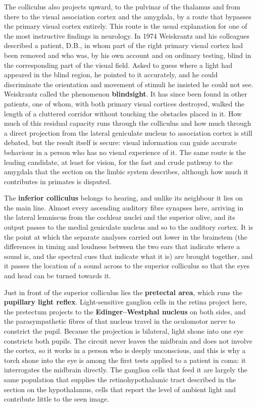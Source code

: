 \documentclass[11pt]{article}
\begin{document}
The colliculus also projects upward, to the pulvinar of the thalamus and from there to the visual association cortex and the amygdala, by a route that bypasses the primary visual cortex entirely. This route is the usual explanation for one of the most instructive findings in neurology. In 1974 Weiskrantz and his colleagues described a patient, D.B., in whom part of the right primary visual cortex had been removed and who was, by his own account and on ordinary testing, blind in the corresponding part of the visual field. Asked to guess where a light had appeared in the blind region, he pointed to it accurately, and he could discriminate the orientation and movement of stimuli he insisted he could not see. Weiskrantz called the phenomenon \textbf{blindsight}. It has since been found in other patients, one of whom, with both primary visual cortices destroyed, walked the length of a cluttered corridor without touching the obstacles placed in it. How much of this residual capacity runs through the colliculus and how much through a direct projection from the lateral geniculate nucleus to association cortex is still debated, but the result itself is secure: visual information can guide accurate behaviour in a person who has no visual experience of it. The same route is the leading candidate, at least for vision, for the fast and crude pathway to the amygdala that the section on the limbic system describes, although how much it contributes in primates is disputed.

The \textbf{inferior colliculus} belongs to hearing, and unlike its neighbour it lies on the main line. Almost every ascending auditory fibre synapses here, arriving in the lateral lemniscus from the cochlear nuclei and the superior olive, and its output passes to the medial geniculate nucleus and so to the auditory cortex. It is the point at which the separate analyses carried out lower in the brainstem (the differences in timing and loudness between the two ears that indicate where a sound is, and the spectral cues that indicate what it is) are brought together, and it passes the location of a sound across to the superior colliculus so that the eyes and head can be turned towards it.

Just in front of the superior colliculus lies the \textbf{pretectal area}, which runs the \textbf{pupillary light reflex}. Light-sensitive ganglion cells in the retina project here, the pretectum projects to the \textbf{Edinger--Westphal nucleus} on both sides, and the parasympathetic fibres of that nucleus travel in the oculomotor nerve to constrict the pupil. Because the projection is bilateral, light shone into one eye constricts both pupils. The circuit never leaves the midbrain and does not involve the cortex, so it works in a person who is deeply unconscious, and this is why a torch shone into the eye is among the first tests applied to a patient in coma: it interrogates the midbrain directly. The ganglion cells that feed it are largely the same population that supplies the retinohypothalamic tract described in the section on the hypothalamus, cells that report the level of ambient light and contribute little to the seen image.
\end{document}

